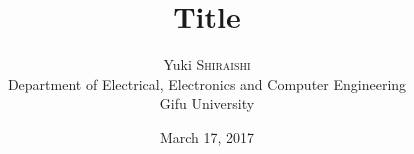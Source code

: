 \begin{titlepage}
  \title{
    Title
  }
  \author{
    Yuki \textsc{Shiraishi}\\
    {\small Department of Electrical, Electronics and Computer Engineering} \\
    {\small Gifu University}
  }
  \date{March 17, 2017}
\end{titlepage}
